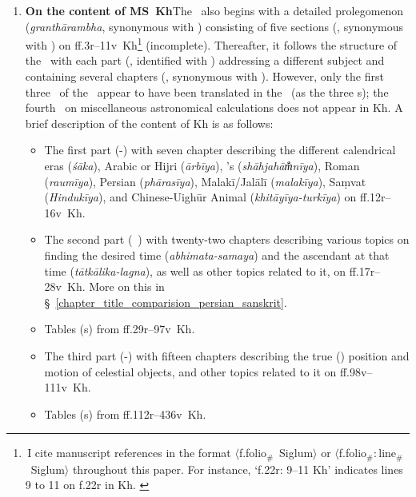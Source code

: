 \begin{enumerate}[topsep=0pt]
    \item \textbf{On the content of MS~Kh}\quad \label{ms_kh_content_siddhantasindhu}The \Siddhantasindhu\ also begins with a detailed prolegomenon (\textit{granthārambha}, synonymous with \muqaddima) consisting of five sections (\prakara, synonymous with \qism) on ff.\thinspace 3r--11v~Kh\footnote{\,I cite manuscript references in the format $\langle$f.\thinspace folio$_\text{\#}$~Siglum$\rangle$ or $\langle$f.\thinspace folio$_\text{\#}$:\,line$_\text{\#}$~Siglum$\rangle$ throughout this paper. For instance, `f.\thinspace 22r: 9--11 Kh' indicates lines 9 to 11 on f.\thinspace 22r in Kh. \label{reference_folio_line_syntax}} (incomplete). Thereafter, it follows the structure of the \ZijiShahJahani\ with each part (\kanda, identified with \maqala) addressing a different subject and containing several chapters (\adhyaya, synonymous with \bab). However, 
    only the first three \maqalat\ of the \ZijiShahJahani\ appear to have been translated in the \Siddhantasindhu\ (as the three \kanda s); the fourth \maqala\ on miscellaneous astronomical calculations does not appear in Kh. A brief description of the content of Kh is as follows:
    \begin{itemize}
        \item The first part (\prathama-\kanda) with seven chapter describing the different calendrical eras (\textit{śāka}), \viz Arabic or Hijri (\textit{ārbīya}), \Shahjahan's (\textit{shāhjahām̐nīya}), Roman (\textit{raumīya}), Persian (\textit{phārasīya}), Malakī/Jalālī (\textit{ma\-lakīya}), Saṃvat (\textit{Hindukīya}), and Chinese-Uighūr Animal (\textit{khitāyīya-tur\-kīya}) on ff.\thinspace 12r--16v~Kh.
        \item The second part (\dvitiya\ \kanda) with twenty-two chapters describing various topics on finding the desired time (\textit{abhimata-samaya}) and the ascendant at that time (\textit{tātkālika-lagna}), as well as other topics related to it, on ff.\thinspace 17r--28v~Kh. More on this in \S~\ref{chapter_title_comparision_persian_sanskrit}.
        \item Tables (\kosthaka s) from ff.\thinspace 29r--97v~Kh.
        \item The third part (\trtiya-\kanda) with fifteen chapters describing the true (\sphuta) position and motion of celestial objects, and other topics related to it on ff.\thinspace 98v--111v~Kh.
        \item Tables (\kosthaka s) from ff.\thinspace 112r--436v~Kh.

\end{itemize}
\end{enumerate}
